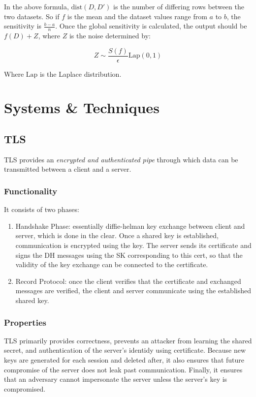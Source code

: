 \documentclass{article}
\begin{document}
\begin{multicols*}{2}
In the above formula, $\text{dist}(D, D')$ is the number of differing rows between the two datasets. So if $f$ is the mean and the dataset values range from $a$ to $b$, the sensitivity is $\frac{b-a}{n}$. Once the global sensitivity is calculated, the output should be $f(D) + Z$, where $Z$ is the noise determined by:

\[ Z \sim \frac{S(f)}{\epsilon} \text{Lap}(0,1) \]

Where $\text{Lap}$ is the Laplace distribution.

\section{Systems \& Techniques}
\subsection{TLS}
TLS provides an \textit{encrypted and authenticated pipe} through which data can be transmitted between a client and a server. 

\subsubsection{Functionality}
It consists of two phases:
\begin{enumerate}[noitemsep, topsep=0pt]
	\item Handshake Phase: essentially diffie-helman key exchange between client and server, which is done in the clear. Once a shared key is established, communication is encrypted using the key. The server sends its certificate and signs the DH messages using the SK corresponding to this cert, so that the validity of the key exchange can be connected to the certificate.
	\item Record Protocol: once the client verifies that the certificate and exchanged messages are verified, the client and server communicate using the established shared key.
\end{enumerate}

\subsubsection{Properties}
TLS primarily provides correctness, prevents an attacker from learning the shared secret, and authentication of the server's identidy using certificate. Because new keys are generated for each session and deleted after, it also ensures that future compromise of the server does not leak past communication. Finally, it ensures that an adversary cannot impersonate the server unless the server's key is compromised. 


\end{multicols*}
\end{document}
